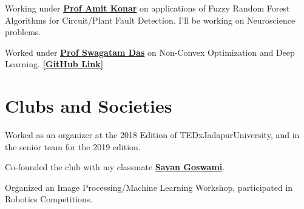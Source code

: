 \documentclass[]{deedy-resume-openfont}
\begin{document}
\begin{minipage}[t]{0.66\textwidth}
Working under \textbf{\href{https://www.amitkonar.com/}{Prof Amit Konar}} on applications of Fuzzy Random Forest Algorithms for Circuit/Plant Fault Detection. I'll be working on Neuroscience problems. 
\sectionsep

Worked under \textbf{\href{https://www.isical.ac.in/~swagatam.das/}{Prof Swagatam Das}} on Non-Convex Optimization and Deep Learning.
\textbf{\href{https://github.com/AyanSinhaMahapatra/Gene_Algos}{ [GitHub Link] }}


\section{Clubs and Societies}
 
Worked as an organizer at the 2018 Edition of TEDxJadapurUniversity, and in the senior team for the 2019 edition.  
\sectionsep

Co-founded the club with my classmate \textbf{\href{https://github.com/Sayan98}{Sayan Goswami}}. \\
\sectionsep 

Organized an Image Processing/Machine Learning Workshop, participated in Robotics Competitions. 
\sectionsep


\end{minipage} 
\end{document}
